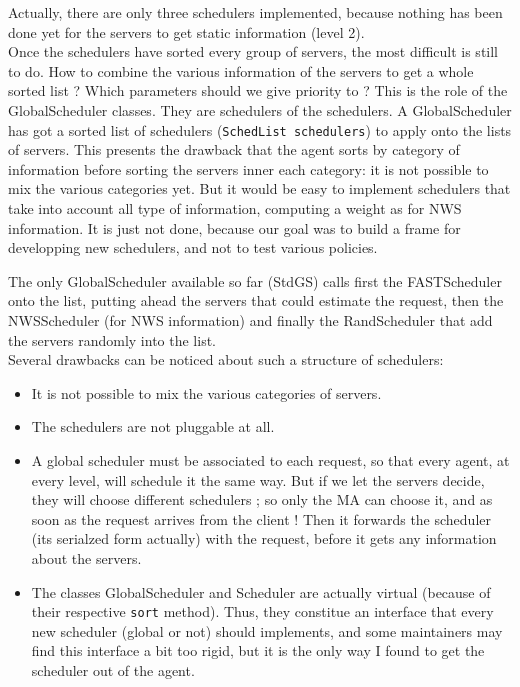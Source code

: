 Actually, there are only three schedulers implemented, because nothing has been
done yet for the servers to get static information (level 2).
\\

Once the schedulers have sorted every group of servers, the most difficult is
still to do. How to combine the various information of the servers to get a
whole sorted list ? Which parameters should we give priority to ? This is the
role of the \textsf{GlobalScheduler} classes. They are schedulers of the
schedulers. A \textsf{GlobalScheduler} has got a sorted list of schedulers
(\texttt{SchedList schedulers}) to apply onto the lists of servers. This
presents the drawback that the agent sorts by category of information before
sorting the servers inner each category: it is not possible to mix the various
categories yet. But it would be easy to implement schedulers that take into
account all type of information, computing a weight as for NWS information. It
is just not done, because our goal was to build a frame for developping new
schedulers, and not to test various policies.

The only \textsf{GlobalScheduler} available so far (\textsf{StdGS}) calls first
the \textsf{FASTScheduler} onto the list, putting ahead the servers that could
estimate the request, then the \textsf{NWSScheduler} (for NWS information) and
finally the \textsf{RandScheduler} that add the servers randomly into the list.
\\

Several drawbacks can be noticed about such a structure of schedulers:
\begin{itemize}
\item It is not possible to mix the various categories of servers.
\item The schedulers are not pluggable at all.
\item A global scheduler must be associated to each request, so that every
  agent, at every level, will schedule it the same way. But if we let the
  servers decide, they will choose different schedulers ; so only the MA can
  choose it, and as soon as the request arrives from the client ! Then it
  forwards the scheduler (its serialzed form actually) with the request, before
  it gets any information about the servers.
\item The classes \textsf{GlobalScheduler} and \textsf{Scheduler} are actually
  virtual (because of their respective \texttt{sort} method). Thus, they
  constitue an interface that every new scheduler (global or not) should
  implements, and some maintainers may find this interface a bit too rigid, but
  it is the only way I found to get the scheduler out of the agent.
\end{itemize}

